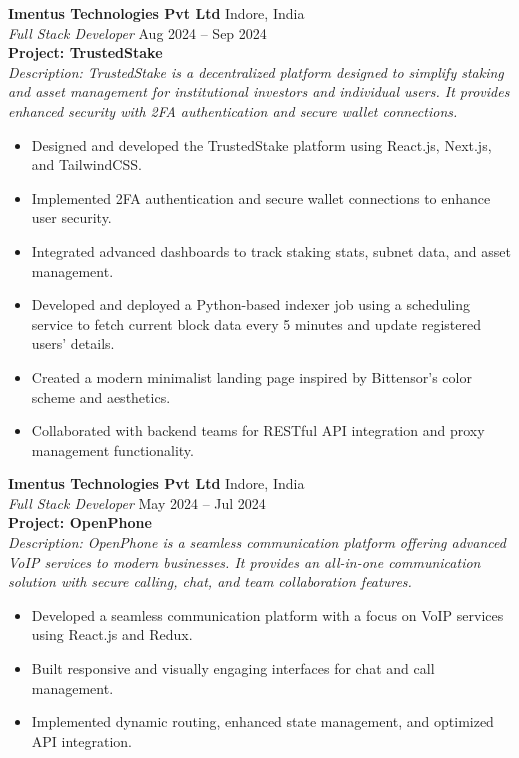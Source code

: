 \documentclass[a4paper,11pt]{article}
\begin{document}
\noindent\textbf{Imentus Technologies Pvt Ltd} \hfill Indore, India \\
\textit{Full Stack Developer} \hfill Aug 2024 – Sep 2024 \\
\textbf{Project: TrustedStake} \\
\textit{Description: TrustedStake is a decentralized platform designed to simplify staking and asset management for institutional investors and individual users. It provides enhanced security with 2FA authentication and secure wallet connections.}\\
\begin{itemize}[leftmargin=*]
    \item Designed and developed the TrustedStake platform using React.js, Next.js, and TailwindCSS.
    \item Implemented 2FA authentication and secure wallet connections to enhance user security.
    \item Integrated advanced dashboards to track staking stats, subnet data, and asset management.
    \item Developed and deployed a Python-based indexer job using a scheduling service to fetch current block data every 5 minutes and update registered users’ details.
    \item Created a modern minimalist landing page inspired by Bittensor’s color scheme and aesthetics.
    \item Collaborated with backend teams for RESTful API integration and proxy management functionality.
\end{itemize}

\noindent\textbf{Imentus Technologies Pvt Ltd} \hfill Indore, India \\
\textit{Full Stack Developer} \hfill May 2024 – Jul 2024 \\
\textbf{Project: OpenPhone} \\
\textit{Description: OpenPhone is a seamless communication platform offering advanced VoIP services to modern businesses. It provides an all-in-one communication solution with secure calling, chat, and team collaboration features.}\\
\begin{itemize}[leftmargin=*]
    \item Developed a seamless communication platform with a focus on VoIP services using React.js and Redux.
    \item Built responsive and visually engaging interfaces for chat and call management.
    \item Implemented dynamic routing, enhanced state management, and optimized API integration.
\end{itemize}
\end{document}
